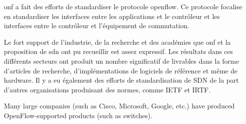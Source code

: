 \gls{onf} a fait des efforts de standardiser le protocole \gls{openflow}. Ce protocole focalise en standardiser les interfaces entre les applications et le contrôleur et les interfaces entre le contrôleur et l'équipement de commutation.\cite{SurveySDNArchi}

Le fort support de l'industrie, de la recherche et des académies que \gls{onf} et la proposition de \gls{sdn} ont pu recueillir est assez expressif. Les résultats dans ces différents secteurs ont produit un nombre significatif de livrables dans la forme d'articles de recherche, d'implémentations de logiciels de référence et même de hardware. Il y a eu également des efforts de standardisation de SDN de la part d'autres organisations produisant des normes, comme IETF et IRTF. \cite{SurveySDNIntro}


Many large companies (such as Cisco, Microsoft, Google, etc.) have produced OpenFlow-supported products (such as switches).



